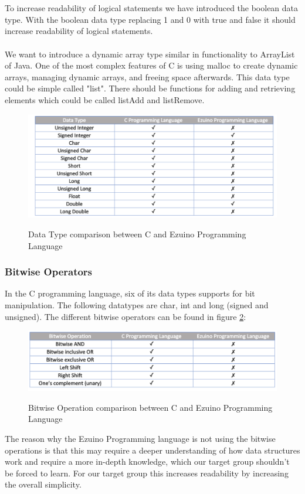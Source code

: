 \\\\
To increase readability of logical statements we have introduced the boolean data type. With the boolean data type replacing 1 and 0 with true and false it should increase readability of logical statements. 
\\ \\
We want to introduce a dynamic array type similar in functionality to ArrayList of Java. One of the most complex features of C is using malloc to create dynamic arrays, managing dynamic arrays, and freeing space afterwards. This data type could be simple called "list". There should be functions for adding and retrieving elements which could be called listAdd and listRemove. 
\begin{figure}[H]
\centering
\caption{Data Type comparison between C and Ezuino Programming Language}
\includegraphics[scale=0.60]{figures/language_features/langf01.png}
\label{lf01}
\end{figure}
\subsubsection*{Bitwise Operators}
In the C programming language, six of its data types supports for bit manipulation. The following datatypes are char, int and long (signed and unsigned).  The different bitwise operators can be found in figure \ref{lf02}: 
\begin{figure}[H]
\centering
\caption{Bitwise Operation comparison between C and Ezuino Programming Language}
\includegraphics[scale=0.60]{figures/language_features/langf02.png}
\label{lf02}
\end{figure}
The reason why the Ezuino Programming language is not using the bitwise operations is that this may require a deeper understanding of how data structures work and require a more in-depth knowledge, which our target group shouldn't be forced to learn. For our target group this increases readability by increasing the overall simplicity.
